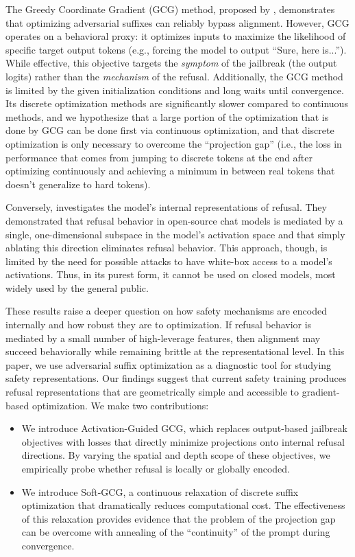 \documentclass[letterpaper]{article} %
\begin{document}
The Greedy Coordinate Gradient (GCG) method, proposed by \cite{zou2023universal}, demonstrates that optimizing adversarial suffixes can reliably bypass alignment. However, GCG operates on a behavioral proxy: it optimizes inputs to maximize the likelihood of specific target output tokens (e.g., forcing the model to output ``Sure, here is...''). While effective, this objective targets the \textit{symptom} of the jailbreak (the output logits) rather than the \textit{mechanism} of the refusal. Additionally, the GCG method is limited by the given initialization conditions and long waits until convergence. Its discrete optimization methods are significantly slower compared to continuous methods, and we hypothesize that a large portion of the optimization that is done by GCG can be done first via continuous optimization, and that discrete optimization is only necessary to overcome the ``projection gap'' (i.e., the loss in performance that comes from jumping to discrete tokens at the end after optimizing continuously and achieving a minimum in between real tokens that doesn't generalize to hard tokens).

Conversely, \cite{arditi2024refusal} investigates the model's internal representations of refusal. They demonstrated that refusal behavior in open-source chat models is mediated by a single, one-dimensional subspace in the model's activation space and that simply ablating this direction eliminates refusal behavior. This approach, though, is limited by the need for possible attacks to have white-box access to a model's activations. Thus, in its purest form, it cannot be used on closed models, most widely used by the general public.

These results raise a deeper question on how safety mechanisms are encoded internally and how robust they are to optimization. If refusal behavior is mediated by a small number of high-leverage features, then alignment may succeed behaviorally while remaining brittle at the representational level. In this paper, we use adversarial suffix optimization as a diagnostic tool for studying safety representations. Our findings suggest that current safety training produces refusal representations that are geometrically simple and accessible to gradient-based optimization. We make two contributions:
\begin{itemize}
    \item We introduce Activation-Guided GCG, which replaces output-based jailbreak objectives with losses that directly minimize projections onto internal refusal directions. By varying the spatial and depth scope of these objectives, we empirically probe whether refusal is locally or globally encoded.

    \item We introduce Soft-GCG, a continuous relaxation of discrete suffix optimization that dramatically reduces computational cost. The effectiveness of this relaxation provides evidence that the problem of the projection gap can be overcome with annealing of the ``continuity'' of the prompt during convergence.
\end{itemize}
\end{document}
